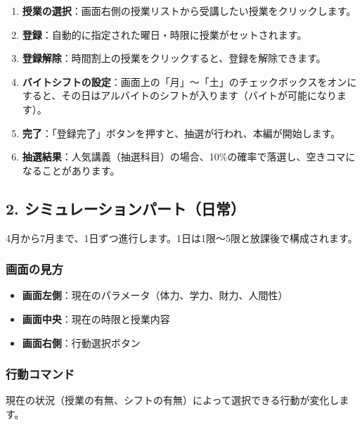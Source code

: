 \documentclass[a4paper,11pt]{ltjsarticle}
\begin{document}
\begin{enumerate}
    \item \textbf{授業の選択}：画面右側の授業リストから受講したい授業をクリックします。
    \item \textbf{登録}：自動的に指定された曜日・時限に授業がセットされます。
    \item \textbf{登録解除}：時間割上の授業をクリックすると、登録を解除できます。
    \item \textbf{バイトシフトの設定}：画面上の「月」～「土」のチェックボックスをオンにすると、その日はアルバイトのシフトが入ります（バイトが可能になります）。
    \item \textbf{完了}：「登録完了」ボタンを押すと、抽選が行われ、本編が開始します。
    \item \textbf{抽選結果}：人気講義（抽選科目）の場合、10\%の確率で落選し、空きコマになることがあります。
\end{enumerate}

\subsection{2. シミュレーションパート（日常）}
4月から7月まで、1日ずつ進行します。1日は1限～5限と放課後で構成されます。

\subsubsection*{画面の見方}
\begin{itemize}
    \item \textbf{画面左側}：現在のパラメータ（体力、学力、財力、人間性）
    \item \textbf{画面中央}：現在の時限と授業内容
    \item \textbf{画面右側}：行動選択ボタン
\end{itemize}

\subsubsection*{行動コマンド}
現在の状況（授業の有無、シフトの有無）によって選択できる行動が変化します。
\end{document}
